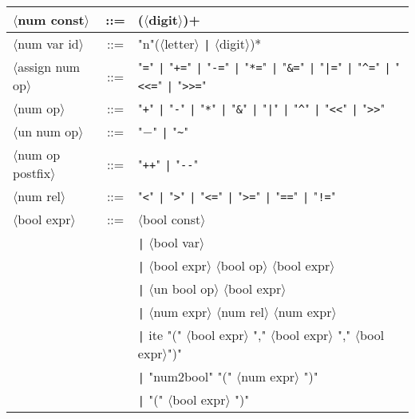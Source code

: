 \documentclass[a4paper]{article}
\begin{document}
{\begin{center}
\begin{tabular}{lcl}
$\langle$num const$\rangle$ & ::= & ($\langle$digit$\rangle$)+                                                                                \\ \hline

$\langle$num var id$\rangle$ & ::= & "n"($\langle$letter$\rangle$ \verb_|_ $\langle$digit$\rangle$)*                                          \\ \hline

$\langle$assign num op$\rangle$   & ::= & "\verb|=|" \verb_|_ "\verb|+=|" \verb_|_ "\verb|-=|" \verb_|_ "\verb|*=|" \verb_|_ "\verb|&=|" \verb_|_ "\verb_|=_" \verb_|_ "\verb|^=|" \verb_|_ "\verb|<<=|" \verb_|_ "\verb|>>=|"    \\ \hline
$\langle$num op$\rangle$          & ::= & "\verb|+|" \verb_|_ "\verb|-|" \verb_|_ "\verb|*|" \verb_|_ "\verb|&|" \verb_|_ "\verb_|_" \verb_|_ "\verb|^|" \verb_|_ "\verb|<<|" \verb_|_ "\verb|>>|"    \\ \hline
$\langle$un num op$\rangle$       & ::= & "$-$" \verb_|_ "\verb|~|"                                                                           \\ \hline
$\langle$num op postfix$\rangle$  & ::= & "\verb|++|" \verb_|_ "\verb|--|"                                                                    \\ \hline
$\langle$num rel$\rangle$         & ::= & "\verb|<|" \verb_|_ "\verb|>|" \verb_|_ "\verb|<=|" \verb_|_ "\verb|>=|" \verb_|_ "\verb|==|" \verb_|_ "\verb|!=|" \\ \hline

$\langle$bool expr$\rangle$ & ::= & $\langle$bool const$\rangle$                                                                              \\
             &     & \verb_|_ $\langle$bool var$\rangle$                                                                                      \\
             &     & \verb_|_ $\langle$bool expr$\rangle$ $\langle$bool op$\rangle$ $\langle$bool expr$\rangle$                               \\
             &     & \verb_|_ $\langle$un bool op$\rangle$ $\langle$bool expr$\rangle$                                                        \\
             &     & \verb_|_ $\langle$num expr$\rangle$ $\langle$num rel$\rangle$ $\langle$num expr$\rangle$                                 \\
             &     & \verb_|_ ite "(" $\langle$bool expr$\rangle$ "," $\langle$bool expr$\rangle$ "," $\langle$bool expr$\rangle$")"          \\
             &     & \verb_|_ "num2bool" "(" $\langle$num expr$\rangle$ ")"                                                                   \\
             &     & \verb_|_ "(" $\langle$bool expr$\rangle$ ")"                                                                             \\ \hline


\end{tabular}
\end{center}}
\end{document}
